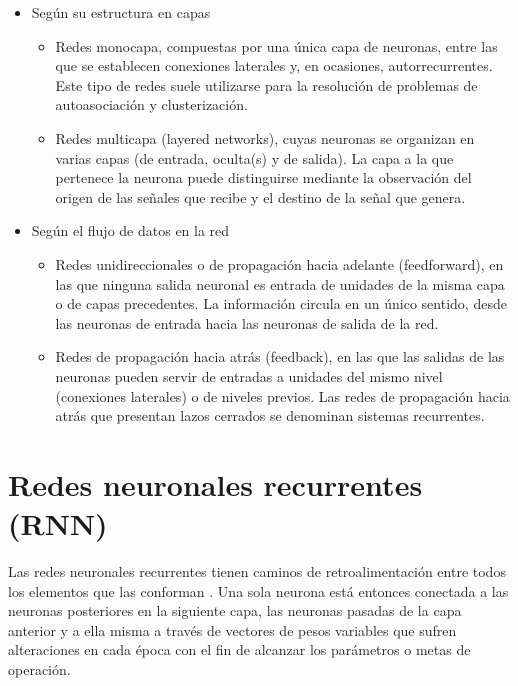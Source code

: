 \begin{itemize}
\item Según su estructura en capas
\begin{itemize}
  \item Redes monocapa, compuestas por una única capa de neuronas, entre las que se establecen conexiones laterales y, en ocasiones, autorrecurrentes. Este tipo de redes suele utilizarse para la resolución de problemas de autoasociación y clusterización.

  \item Redes multicapa (layered networks), cuyas neuronas se organizan en varias capas (de entrada, oculta(s) y de salida). La capa a la que pertenece la neurona puede distinguirse mediante la observación del origen de las señales que recibe y el destino de la señal que genera.
\end{itemize}

\item Según el flujo de datos en la red

\begin{itemize}
  \item Redes unidireccionales o de propagación hacia adelante (feedforward), en las que ninguna salida neuronal es entrada de unidades de la misma capa o de capas precedentes. La información circula en un único sentido, desde las neuronas de entrada hacia las neuronas de salida de la red.

  \item Redes de propagación hacia atrás (feedback), en las que las salidas de las neuronas pueden servir de entradas a unidades del mismo nivel (conexiones laterales) o de niveles previos. Las redes de propagación hacia atrás que presentan lazos cerrados se denominan sistemas recurrentes.
\end{itemize}
\end{itemize}

\section{Redes neuronales recurrentes (RNN)}

Las redes neuronales recurrentes tienen caminos de retroalimentación entre todos los elementos que las conforman \cite{montesdeoca2016estudios}. Una sola neurona está entonces conectada a las neuronas posteriores en la siguiente capa, las neuronas pasadas de la capa anterior y a ella misma a través de vectores de pesos variables que sufren alteraciones en cada época con el fin de alcanzar los parámetros o metas de operación.

